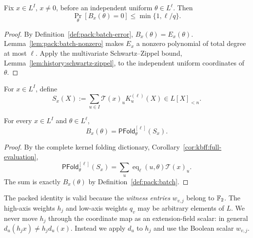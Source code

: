 \begin{theorem}\label{thm:pack:batch-sound}
Fix $x\in L^I$, $x\neq0$, before an independent
uniform $\theta\in L^\ell$. Then
\[
 \boxed{
 \Pr_\theta[B_x(\theta)=0]
 \leq\min\{1,\ell/q\}.}
\]
\end{theorem}
\begin{proof}
By Definition~\ref{def:pack:batch-error},
$B_x(\theta)=E_x(\theta)$.
Lemma~\ref{lem:pack:batch-nonzero}
makes $E_x$ a nonzero polynomial of
total degree at most $\ell$.
Apply the multivariate Schwartz--Zippel
bound, Lemma~\ref{lem:history:schwartz-zippel},
to the independent uniform coordinates of $\theta$.
\end{proof}

\begin{definition}\label{def:pack:kernel-transpose}
For $x\in L^I$, define
\[
 S_x(X):=\sum_{u\in I}\mathcal T(x)_uK_u^{(\ell)}(X)
       \in L[X]_{<n}.
\]
\end{definition}

\begin{lemma}\label{lem:pack:kernel-batch}
For every $x\in L^I$ and $\theta\in L^\ell$,
\[
 \boxed{
 B_x(\theta)=\mathsf{PFold}^{[\ell]}_\theta(S_x).}
\]
\end{lemma}
\begin{proof}
By the complete kernel folding dictionary,
Corollary~\ref{cor:kbff:full-evaluation},
\[
 \mathsf{PFold}^{[\ell]}_\theta(S_x)
 =\sum_u\operatorname{eq}_\ell(u,\theta)\mathcal T(x)_u.
\]
The sum is exactly $B_x(\theta)$
by Definition~\ref{def:pack:batch}.
\end{proof}

\begin{remark}
The packed identity is valid because the
\emph{witness entries} $w_{v,j}$ belong to $\mathbb{F}_2$.
The high-axis weights $h_j$ and low-axis
weights $q_v$ may be arbitrary elements
of $L$. We never move $h_j$ through the
coordinate map as an extension-field scalar:
in general $d_u(h_jx)\neq h_jd_u(x)$.
Instead we apply $d_u$ to $h_j$ and use
the Boolean scalar $w_{v,j}$.
\end{remark}
